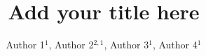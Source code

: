 \documentclass[openacc]{rsproca_new}%
\begin{document}
\title{Add your title here}

\author{%
Author 1$^{1}$, Author 2$^{2,1}$, Author 3$^{1}$, Author 4$^{1}$}

\address{$^{1}$Address 1\\
$^{2}$Address 2}

\subject{xxxxx, xxxxx, xxxx}



\begin{abstract}

    \lipsum[1-4]

\end{abstract}


\begin{fmtext}

    \lipsum[1]
    
\end{fmtext}


\maketitle
\end{document}
